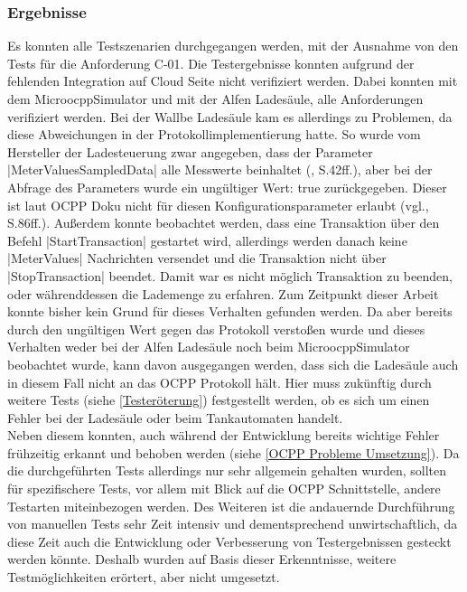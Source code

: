 \subsubsection{Ergebnisse}\label{Testergebnisse}
Es konnten alle Testszenarien durchgegangen werden, mit der Ausnahme von den Tests für die Anforderung C-01. Die Testergebnisse konnten aufgrund der fehlenden Integration auf Cloud Seite nicht verifiziert werden. Dabei konnten mit dem MicroocppSimulator und mit der Alfen Ladesäule, alle Anforderungen verifiziert werden. Bei der Wallbe Ladesäule kam es allerdings zu Problemen, da diese Abweichungen in der Protokollimplementierung hatte. So wurde vom Hersteller der Ladesteuerung zwar angegeben, dass der Parameter \spverb|MeterValuesSampledData| alle Messwerte beinhaltet (\cite{Wallbe_Steuerung}, S.42ff.), aber bei der Abfrage des Parameters wurde ein ungültiger Wert: \glqq{}true\grqq{} zurückgegeben. Dieser ist laut OCPP Doku nicht für diesen Konfigurationsparameter erlaubt (vgl.\cite{OCPP-1.6-edition-2}, S.86ff.). Außerdem konnte beobachtet werden, dass eine Transaktion über den Befehl \spverb|StartTransaction| gestartet wird, allerdings werden danach keine \spverb|MeterValues| Nachrichten versendet und die Transaktion nicht über \spverb|StopTransaction| beendet. Damit war es nicht möglich Transaktion zu beenden, oder währenddessen die Lademenge zu erfahren. Zum Zeitpunkt dieser Arbeit konnte bisher kein Grund für dieses Verhalten gefunden werden. Da aber bereits durch den ungültigen Wert gegen das Protokoll verstoßen wurde und dieses Verhalten weder bei der Alfen Ladesäule noch beim MicroocppSimulator beobachtet wurde, kann davon ausgegangen werden, dass sich die Ladesäule auch in diesem Fall nicht an das OCPP Protokoll hält. Hier muss zukünftig durch weitere Tests (siehe \autoref{Testeröterung}) festgestellt werden, ob es sich um einen Fehler bei der Ladesäule oder beim Tankautomaten handelt.\\

\noindent Neben diesem konnten, auch während der Entwicklung bereits wichtige Fehler frühzeitig erkannt und behoben werden (siehe \autoref{OCPP Probleme Umsetzung}). Da die durchgeführten Tests allerdings nur sehr allgemein gehalten wurden, sollten für spezifischere Tests, vor allem mit Blick auf die OCPP Schnittstelle, andere Testarten miteinbezogen werden. Des Weiteren ist die andauernde Durchführung von manuellen Tests sehr Zeit intensiv und dementsprechend unwirtschaftlich, da diese Zeit auch die Entwicklung oder Verbesserung von Testergebnissen gesteckt werden könnte. Deshalb wurden auf Basis dieser Erkenntnisse, weitere Testmöglichkeiten erörtert, aber nicht umgesetzt. 
